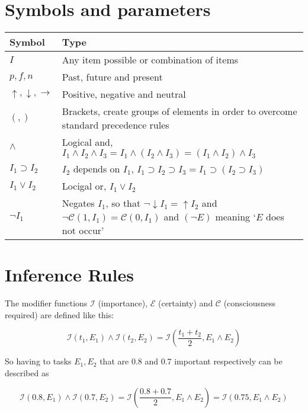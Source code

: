 \documentclass{scrartcl}
\begin{document}
\section{Symbols and parameters}

\begin{tabular}{l|l}
	Symbol & Type \\ \hline
	$I$ & Any item possible or combination of items \\
	$p, f, n$ & Past, future and present \\
	$\uparrow, \downarrow, \rightarrow$ & Positive, negative and neutral \\
	$(, )$ & Brackets, create groups of elements in order to overcome standard precedence rules \\
	$\wedge$ & Logical and, $I_1 \wedge I_2 \wedge I_3 =  I_1 \wedge (I_2 \wedge I_3) = (I_1 \wedge I_2) \wedge I_3$\\
	$I_1 \supset I_2$ & $I_2$ depends on $I_1$, $I_1 \supset I_2 \supset I_3 = I_1 \supset (I_2 \supset I_3)$\\
	$I_1 \lor I_2$ & Locigal or, $I_1 \lor I_2$ \\
	$\lnot I_1$ & Negates $I_1$, so that $\lnot \downarrow I_1 = \uparrow I_2$ and $\lnot \mathcal{C}(1, I_1) = \mathcal{C}(0, I_1)$ and $(\lnot E)$ meaning `$E$ does not occur'\footnotemark
\end{tabular}


\section{Inference Rules}

The modifier functions $\mathcal{I}$ (importance), $\mathcal{E}$ (certainty) and $\mathcal{C}$ (consciousness required) are defined like this:

\begin{equation} \mathcal{I}(t_1, E_1) \wedge \mathcal{I}(t_2, E_2) = \mathcal{I}(\frac{t_1 + t_2}{2}, E_1 \wedge E_2) \end{equation}

So having to tasks $E_1, E_2$ that are 0.8 and 0.7 important respectively can be described as

\begin{equation} \mathcal{I}(0.8, E_1) \wedge \mathcal{I}(0.7, E_2) = \mathcal{I}\left(\frac{0.8 + 0.7}{2}, E_1 \wedge E_2\right) = \mathcal{I}(0.75, E_1 \wedge E_2)\end{equation}
\end{document}

